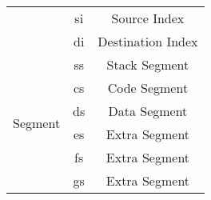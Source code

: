 \documentclass[11pt,a5paper,footinclude=true,headinclude=true]{scrbook} %
\begin{document}
\begin{center}
\begin{tabular}{|c|c|c|c|}
		\cline{2-4}
		                                  & \multicolumn{2}{c|}{\multirow{2}{*}{si}} & \multirow{2}{*}{Source Index}                                    \\
		                                  & \multicolumn{2}{c|}{}                    &                                                                  \\
		\cline{2-4}
		                                  & \multicolumn{2}{c|}{\multirow{2}{*}{di}} & \multirow{2}{*}{Destination Index}                               \\
		                                  & \multicolumn{2}{c|}{}                    &                                                                  \\
		\hline
		\multirow{6}{*}{Segment}          & \multicolumn{2}{c|}{ss}                  & Stack Segment                                                    \\
		\cline{2-4}
		                                  & \multicolumn{2}{c|}{cs}                  & Code Segment                                                     \\
		\cline{2-4}
		                                  & \multicolumn{2}{c|}{ds}                  & Data Segment                                                     \\
		\cline{2-4}
		                                  & \multicolumn{2}{c|}{es}                  & Extra Segment                                                    \\
		\cline{2-4}
		                                  & \multicolumn{2}{c|}{fs}                  & Extra Segment                                                    \\
		\cline{2-4}
		                                  & \multicolumn{2}{c|}{gs}                  & Extra Segment                                                    \\
		\hline
	\end{tabular}
\end{center}
\end{document}
